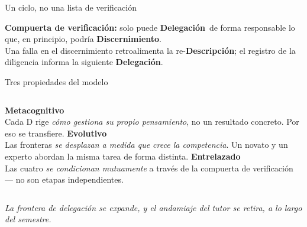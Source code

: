 \documentclass[aspectratio=169,11pt]{beamer}
\newcommand{\Del}{\textcolor{Cdel}{\textbf{Delegación}}}
\newcommand{\Des}{\textcolor{Cdes}{\textbf{Descripción}}}
\newcommand{\Dis}{\textcolor{Cdis}{\textbf{Discernimiento}}}
\begin{document}
\begin{frame}{Un ciclo, no una lista de verificación}
  \begin{center}
  \end{center}
  \begin{center}\small
    \textbf{Compuerta de verificación:} solo puede \Del\ de forma responsable lo que,
    en principio, podría \Dis. \\
    Una falla en el discernimiento retroalimenta la re-\Des; el registro de la
    diligencia informa la siguiente \Del.
  \end{center}
\end{frame}

\begin{frame}{Tres propiedades del modelo}
  \begin{columns}[T,onlytextwidth]
      \textbf{Metacognitivo}\\[0.3em]
      \footnotesize Cada D rige \emph{cómo gestiona su propio pensamiento}, no un
      resultado concreto. Por eso se transfiere.
      \textbf{Evolutivo}\\[0.3em]
      \footnotesize Las fronteras \emph{se desplazan a medida que crece la competencia}.
      Un novato y un experto abordan la misma tarea de forma distinta.
      \textbf{Entrelazado}\\[0.3em]
      \footnotesize Las cuatro \emph{se condicionan mutuamente} a través de la compuerta
      de verificación --- no son etapas independientes.
  \end{columns}
  \vspace{1.2em}
  \begin{center}
    \small\itshape La frontera de delegación se expande, y el andamiaje del tutor se
    retira, a lo largo del semestre.
  \end{center}
\end{frame}
\end{document}
